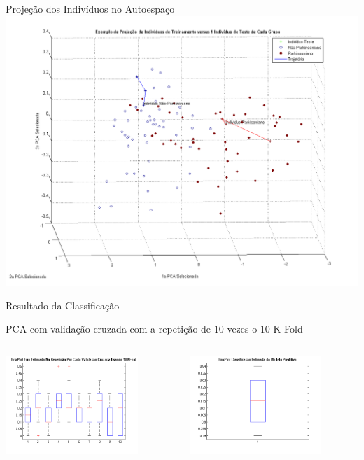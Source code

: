 \documentclass{beamer}
\begin{document}
\begin{frame}{Projeção dos Indivíduos no Autoespaço}
      \center \includegraphics[height=2.6 in]{img/projecao-pca-parkinson-healthy.png}
\end{frame}

\begin{frame}{Resultado da Classificação}
   \begin{block}{PCA com validação cruzada com a repetição de 10 vezes o 10-K-Fold}   
   \begin{columns}[c]
     \begin{column}{0.5\linewidth}
				\includegraphics[width=5cm]{img/boxplot-eigengaits-parkinsondatabase-error-kfold.png}
     \end{column}

     \begin{column}{0.5\linewidth}
				\includegraphics[width=5cm]{img/boxplot-eigengaits-parkinsondatabase.png}
    \end{column}
\end{columns}
\end{block}
\end{frame}
\end{document}
